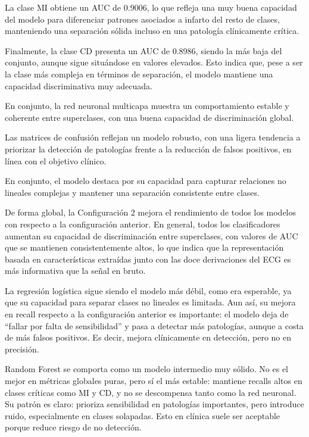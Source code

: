 \documentclass[12pt,a4paper,twoside]{book}
\begin{document}
La clase MI obtiene un AUC de 0.9006, lo que refleja una muy buena capacidad del modelo para diferenciar patrones asociados a infarto del resto de clases, manteniendo una separación sólida incluso en una patología clínicamente crítica.

Finalmente, la clase CD presenta un AUC de 0.8986, siendo la más baja del conjunto, aunque sigue situándose en valores elevados. Esto indica que, pese a ser la clase más compleja en términos de separación, el modelo mantiene una capacidad discriminativa muy adecuada.

\vspace{0.5cm}

En conjunto, la red neuronal multicapa muestra un comportamiento estable y coherente entre superclases, con una buena capacidad de discriminación global.

Las matrices de confusión reflejan un modelo robusto, con una ligera tendencia a priorizar la detección de patologías frente a la reducción de falsos positivos, en línea con el objetivo clínico.

En conjunto, el modelo destaca por su capacidad para capturar relaciones no lineales complejas y mantener una separación consistente entre clases.

\vspace{1cm}

De forma global, la Configuración 2 mejora el rendimiento de todos los modelos con respecto a la configuración anterior. 
En general, todos los clasificadores aumentan su capacidad de discriminación entre superclases, con valores de AUC que se mantienen consistentemente altos, lo que indica que la representación basada en características extraídas junto con las doce derivaciones del ECG es más informativa que la señal en bruto.

La regresión logística sigue siendo el modelo más débil, como era esperable, ya que su capacidad para separar clases no lineales es limitada. 
Aun así, su mejora en recall respecto a la configuración anterior es importante: el modelo deja de “fallar por falta de sensibilidad” y pasa a detectar más patologías, aunque a costa de más falsos positivos. 
Es decir, mejora clínicamente en detección, pero no en precisión.

Random Forest se comporta como un modelo intermedio muy sólido. 
No es el mejor en métricas globales puras, pero sí el más estable: mantiene recalls altos en clases críticas como MI y CD, y no se descompensa tanto como la red neuronal. 
Su patrón es claro: prioriza sensibilidad en patologías importantes, pero introduce ruido, especialmente en clases solapadas. 
Esto en clínica suele ser aceptable porque reduce riesgo de no detección.
\end{document}
